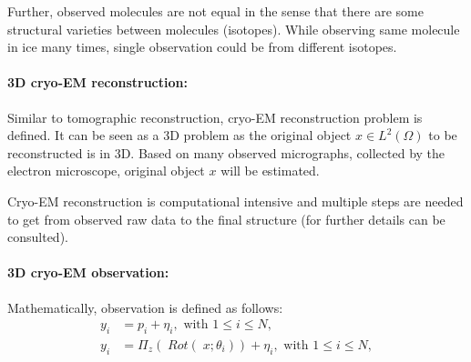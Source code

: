 Further, observed molecules are not equal in the sense that there are some structural varieties between
molecules (isotopes). While observing same molecule in ice many times, single observation could be from different isotopes.

\paragraph{3D cryo-EM reconstruction:}
Similar to tomographic reconstruction, cryo-EM reconstruction problem \cite{cryoEmMath} is defined.
It can be seen as a 3D problem as the original object $x \in L^2(\Omega)$ to be reconstructed is in 3D.
Based on many observed micrographs, collected by the electron microscope, original object $x$ will be estimated.

Cryo-EM reconstruction is computational intensive and multiple steps are needed to get from observed
raw data to the final structure (for further details \cite{singleParticleCryoEm} can be consulted).


\paragraph{3D cryo-EM observation:}
Mathematically, observation is defined as follows:
\begin{equation}
    \label{eq:cryoEmSimple}
    \begin{aligned}
        y_i &= p_i + \eta_i, \text{ with } 1 \leq i \leq N,\\
        y_i &= \Pi_z  (\; Rot (\;x; \theta_i )) + \eta_i, \text{ with } 1 \leq i \leq N,    
    \end{aligned}
\end{equation}

